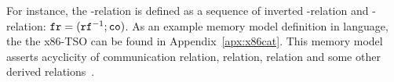 For instance, the \fr-relation is defined as a sequence of inverted \rf-relation and \co-relation: $\mathtt{fr} = (\mathtt{rf}^{-1};\mathtt{co})$. As an example memory model definition in \cat{} language, the the x86-TSO can be found in Appendix~\ref{apx:x86cat}. This memory model asserts acyclicity of communication relation,  relation,  relation and some other derived relations~\cite{owens2009better}.
